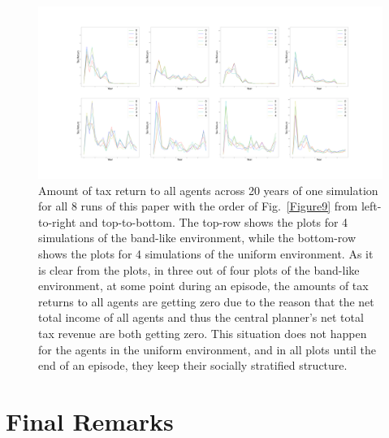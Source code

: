 \documentclass{article}
\begin{document}
\begin{figure}
	\centering
	\includegraphics[width=0.7\linewidth]{"A_Multi-agent_Reinforcement_Learning_Study_of_Emergence_of_Social_Classes_out_of_Arbitrary_Governance_The_Role_of_Environment_Plots/Tax_Return_across_Consequtive_Years_of_an_Episode_for_all_Agents_of_Two_Scenarios"}
	\caption{Amount of tax return to all agents across 20 years of one simulation for all 8 runs of this paper with the order of Fig.~\ref{Figure9} from left-to-right and top-to-bottom. The top-row shows the plots for 4 simulations of the band-like environment, while the bottom-row shows the plots for 4 simulations of the uniform environment. As it is clear from the plots, in three out of four plots of the band-like environment, at some point during an episode, the amounts of tax returns to all agents are getting zero due to the reason that the net total income of all agents and thus the central planner's net total tax revenue are both getting zero. This situation does not happen for the agents in the uniform environment, and in all plots until the end of an episode, they keep their socially stratified structure.}
	\label{Figure6}
\end{figure}

\section{Final Remarks}
\end{document}
